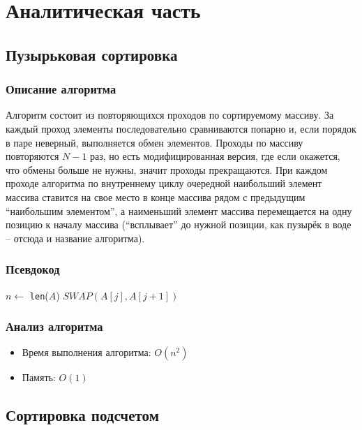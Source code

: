 \chapter{Аналитическая часть}

\section{Пузырьковая сортировка}

\subsection{Описание алгоритма}

Алгоритм состоит из повторяющихся проходов по сортируемому массиву.
За каждый проход элементы последовательно сравниваются попарно и, если порядок в паре неверный, выполняется обмен элементов.
Проходы по массиву повторяются $N-1$ раз, но есть модифицированная версия, где если окажется, что обмены больше не нужны, значит проходы прекращаются.
При каждом проходе алгоритма по внутреннему циклу очередной наибольший элемент массива ставится на свое место в конце массива рядом с предыдущим ``наибольшим элементом'', а наименьший элемент массива перемещается на одну позицию к началу массива (``всплывает'' до нужной позиции, как пузырёк в воде -- отсюда и название алгоритма).

\subsection{Псевдокод}

\begin{algorithmic}
\State $n \gets$ \texttt{len}($A$)
\State $SWAP(A[j], A[j + 1])$
\EndIf
\EndFor
\EndFor
\EndProcedure
\end{algorithmic}

\subsection{Анализ алгоритма}

\begin{itemize}
    \item Время выполнения алгоритма: $O(n^2)$
    \item Память: $O(1)$
\end{itemize}

\section{Сортировка подсчетом}


